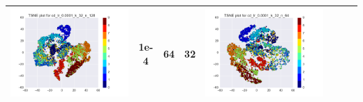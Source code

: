 \documentclass[12pt]{report}
\begin{document}
\begin{table}[H]
\begin{tabular}{ | c | c | c | c || c | c | c| c |}
\begin{minipage}{.3\textwidth}
      \includegraphics[scale=0.25]{cd_lr_0_0001_k_32_n_128.png}
    \end{minipage}
	&
    1e-4 & 64 & 32 &
    \begin{minipage}{.3\textwidth}
      \includegraphics[scale=0.25]{cd_lr_0_0001_k_32_n_64.png}
    \end{minipage}
    \\ \hline
  \end{tabular}
\end{table}
\end{document}
